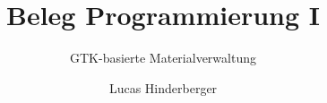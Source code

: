 \documentclass[a4paper]{scrartcl}
\begin{document}
\author{Lucas Hinderberger}
\title{Beleg Programmierung I}
\subtitle{GTK-basierte Materialverwaltung}

\maketitle
\newpage

\tableofcontents
\newpage








\end{document}
